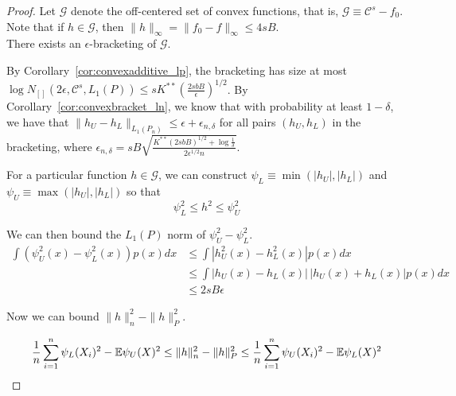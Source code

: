\begin{proof}
Let $\mathcal{G}$ denote the off-centered set of convex functions, that is, $\mathcal{G} \equiv \mathcal{C}^s - f_0$. Note that if $h \in \mathcal{G}$, then $\| h \|_\infty = \| f_0 - f \|_\infty \leq 4 s B$.\\

There exists an $\epsilon$-bracketing of $\mathcal{G}$. 


By Corollary~\ref{cor:convexadditive_lp}, the bracketing has size at most $\log N_{[]}(2\epsilon, \mathcal{C}^s, L_1(P)) \leq s K^{**}\left( \frac{2sbB}{\epsilon} \right)^{1/2}$. By Corollary~\ref{cor:convexbracket_ln}, we know that with probability at least $1-\delta$, we have that $\| h_U - h_L \|_{L_1(P_n)} \leq \epsilon + \epsilon_{n,\delta}$ for all pairs $(h_U, h_L)$ in the bracketing, where $\epsilon_{n,\delta} = sB \sqrt{ \frac{K^{**} (2sbB)^{1/2} + \log \frac{1}{\delta}}{2 \epsilon^{1/2} n}}$.

For a particular function $h \in \mathcal{G}$, we can construct $\psi_L \equiv \min( |h_U|, |h_L|)$ and $\psi_U \equiv \max( |h_U|, |h_L| )$ so that
\[
\psi_L^2 \leq h^2 \leq \psi_U^2
\]

We can then bound the $L_1(P)$ norm of $\psi_U^2 - \psi_L^2$.
\begin{align*}
\int (\psi_U^2(x) - \psi_L^2(x)) p(x)dx  &\leq  \int | h_U^2(x) - h_L^2(x)| p(x) dx \\
   &\leq \int | h_U(x) - h_L(x) | \, |h_U(x) + h_L(x)| p(x) dx \\
   &\leq 2sB \epsilon
\end{align*}


Now we can bound $\| h \|_n^2 - \| h \|_P^2$.

\begin{align}
\frac{1}{n} \sum_{i=1}^n \psi_L(X_i)^2 - {\mathbb E} \psi_U(X)^2  \leq
    \| h \|_n^2 - \| h \|_P^2 \leq
  \frac{1}{n} \sum_{i=1}^n \psi_U(X_i)^2 - {\mathbb E} \psi_L(X)^2  \label{eqn:hpsi_bound}
\end{align}


\end{proof}
